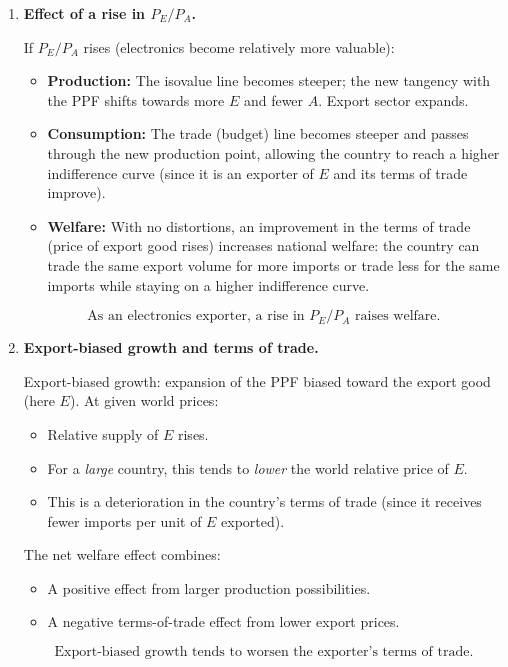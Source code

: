 \documentclass[12pt]{article}
\begin{document}
\begin{enumerate}[label=(\arabic*)]
\item \textbf{Effect of a rise in $P_E/P_A$.}

If $P_E/P_A$ rises (electronics become relatively more valuable):
\begin{itemize}
\item \textbf{Production:} The isovalue line becomes steeper; the new tangency with the PPF shifts towards more $E$ and fewer $A$. Export sector expands.
\item \textbf{Consumption:} The trade (budget) line becomes steeper and passes through the new production point, allowing the country to reach a higher indifference curve (since it is an exporter of $E$ and its terms of trade improve).
\item \textbf{Welfare:} With no distortions, an improvement in the terms of trade (price of export good rises) increases national welfare: the country can trade the same export volume for more imports or trade less for the same imports while staying on a higher indifference curve.
\end{itemize}

\[
\boxed{\text{As an electronics exporter, a rise in }P_E/P_A \text{ raises welfare.}}
\]

\item \textbf{Export-biased growth and terms of trade.}

Export-biased growth: expansion of the PPF biased toward the export good (here $E$). At given world prices:
\begin{itemize}
\item Relative supply of $E$ rises.
\item For a \emph{large} country, this tends to \emph{lower} the world relative price of $E$.
\item This is a deterioration in the country's terms of trade (since it receives fewer imports per unit of $E$ exported).
\end{itemize}

The net welfare effect combines:
\begin{itemize}
\item A positive effect from larger production possibilities.
\item A negative terms-of-trade effect from lower export prices.
\end{itemize}

\[
\boxed{\text{Export-biased growth tends to worsen the exporter's terms of trade.}}
\]

\end{enumerate}
\end{document}
